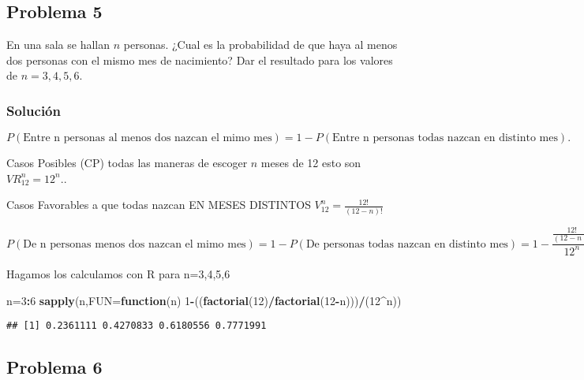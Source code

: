 \documentclass[
]{article}
\newenvironment{Shaded}{\begin{snugshade}}{\end{snugshade}}
\newcommand{\ControlFlowTok}[1]{\textcolor[rgb]{0.13,0.29,0.53}{\textbf{#1}}}
\newcommand{\DataTypeTok}[1]{\textcolor[rgb]{0.13,0.29,0.53}{#1}}
\newcommand{\DecValTok}[1]{\textcolor[rgb]{0.00,0.00,0.81}{#1}}
\newcommand{\KeywordTok}[1]{\textcolor[rgb]{0.13,0.29,0.53}{\textbf{#1}}}
\newcommand{\NormalTok}[1]{#1}
\newcommand{\OperatorTok}[1]{\textcolor[rgb]{0.81,0.36,0.00}{\textbf{#1}}}
\begin{document}
\hypertarget{problema-5}{%
\subsection{Problema 5}\label{problema-5}}

En una sala se hallan \(n\) personas. ¿Cual es la probabilidad de que
haya al menos dos personas con el mismo mes de nacimiento? Dar el
resultado para los valores de \(n=3,4,5,6\).

\hypertarget{soluciuxf3n-5}{%
\subsubsection{Solución}\label{soluciuxf3n-5}}

\[P(\mbox{Entre n personas al menos dos nazcan el mimo mes})=1-P(\mbox{Entre  n personas todas nazcan en distinto mes}).\]

Casos Posibles (CP) todas las maneras de escoger \(n\) meses de 12 esto
son \(VR_{12}^n=12^n.\).

Casos Favorables a que todas nazcan EN MESES DISTINTOS
\(V_{12}^n=\frac{12!}{(12-n)!}\)

\[
P(\mbox{De n personas menos dos nazcan el mimo mes})=
1-P(\mbox{De personas todas nazcan en distinto mes})=
1-\frac{\frac{12!}{(12-n)!}}{12^n}.
\]

Hagamos los calculamos con R para n=3,4,5,6

\begin{Shaded}
\begin{Highlighting}[]
\NormalTok{n=}\DecValTok{3}\OperatorTok{:}\DecValTok{6}
\KeywordTok{sapply}\NormalTok{(n,}\DataTypeTok{FUN=}\ControlFlowTok{function}\NormalTok{(n) }\DecValTok{1}\OperatorTok{{-}}\NormalTok{((}\KeywordTok{factorial}\NormalTok{(}\DecValTok{12}\NormalTok{)}\OperatorTok{/}\KeywordTok{factorial}\NormalTok{(}\DecValTok{12}\OperatorTok{{-}}\NormalTok{n)))}\OperatorTok{/}\NormalTok{(}\DecValTok{12}\OperatorTok{\^{}}\NormalTok{n))}
\end{Highlighting}
\end{Shaded}

\begin{verbatim}
## [1] 0.2361111 0.4270833 0.6180556 0.7771991
\end{verbatim}

\hypertarget{problema-6}{%
\subsection{Problema 6}\label{problema-6}}
\end{document}
